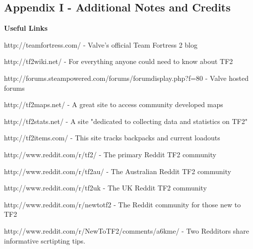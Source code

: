 \subsection{Appendix I - Additional Notes and Credits}
\newenvironment{packed_item}{
\begin{itemize}
  \setlength{\itemsep}{1pt}
  \setlength{\parskip}{0pt}
  \setlength{\parsep}{0pt}
}{\end{itemize}}

{\bf Useful Links}

http://teamfortress.com/ - Valve's official Team Fortress 2 blog

http://tf2wiki.net/ - For everything anyone could need to know about TF2

http://forums.steampowered.com/forums/forumdisplay.php?f=80 - Valve hosted forums 

http://tf2maps.net/ - A great site to access community developed maps

http://tf2stats.net/ - A site "dedicated to collecting data and statistics on TF2"

http://tf2items.com/ - This site tracks backpacks and current loadouts

http://www.reddit.com/r/tf2/ - The primary Reddit TF2 community

http://www.reddit.com/r/tf2au/ - The Australian Reddit TF2 community

http://www.reddit.com/r/tf2uk - The UK Reddit TF2 community

http://www.reddit.com/r/newtotf2 - The Reddit community for those new to TF2

http://www.reddit.com/r/NewToTF2/comments/a6kme/ - Two Redditors share informative scrtipting tips.

